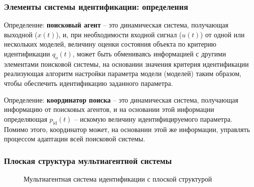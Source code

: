 \documentclass[10pt,utf8]{beamer}
\begin{document}


\begin{frame}
  \frametitle{Элементы системы идентификации: определения}

  Определение: \textbf{поисковый агент} -- это динамическая система, получающая выходной ($x(t)$),
  и, при необходимости входной сигнал ($u(t)$) от одной или нескольких моделей,
  величину оценки состояния объекта по критерию идентификации $q_o(t)$,
  может быть обмениваясь информацией с другими элементами поисковой системы,
  на основании значения критерия идентификации
  реализующая алгоритм настройки параметра модели (моделей)
  таким образом, чтобы обеспечить идентификацию заданного параметра.

  \medskip

  Определение: \textbf{координатор поиска} -- это динамическая система, получающая информацию
  от поисковых агентов, и на основании этой информации определяющая
  $p_{\mathrm{id}}(t)$ -- искомую величину идентифицируемого параметра.
  Помимо этого, координатор может, на основании этой же информации,
  управлять процессом адаптации всей поисковой системы.

\end{frame}




\begin{frame}[fragile]
  \frametitle{Плоская структура мультиагентной системы}

  \begin{figure}[ht!]
  \begin{center}
  
  \end{center}
  \caption{Мультиагентная система идентификации с плоской структурой}
  \label{atu:f:agents_flat}
  \end{figure}

\end{frame}



\end{document}
